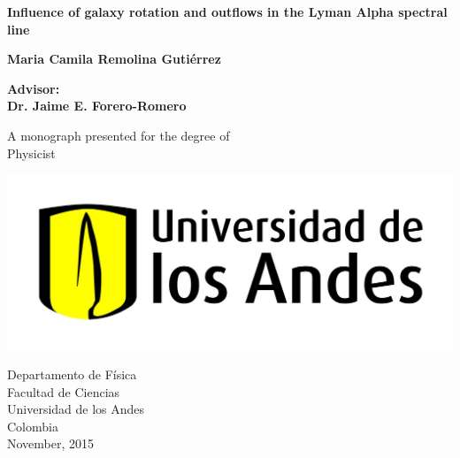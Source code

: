 

\setcounter{page}{1}

\newpage

\thispagestyle{empty}
\begin{center}
  \vspace*{1cm}
  {\Huge \bf Influence of galaxy rotation and outflows in the Lyman Alpha spectral line}

  \vspace*{2cm}
  {\LARGE\bf Maria Camila Remolina Guti\'errez}

  \vspace*{1.5cm}
  {\Large\bf Advisor: \\ Dr. Jaime E. Forero-Romero}

  \vfill

  {\Large A monograph presented for the degree of\\
         [1mm] Physicist}
  \vspace*{0.9cm}
  
   \begin{center}
   \includegraphics[scale=0.12]{figures/uniandes.jpg}
   \end{center}

  {\large Departamento de F\'isica\\
		  [-3mm] Facultad de Ciencias\\
          [-3mm] Universidad de los Andes\\
          [-3mm] Colombia\\
          [1mm]  November, 2015}

\end{center}

